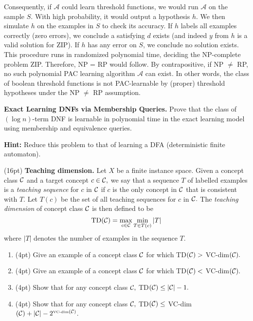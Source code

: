 \documentclass[11pt]{article}
\DeclareMathOperator{\1}{\mathbbm{1}}
\begin{document}
Consequently, if $\mathcal{A}$ could learn threshold functions, we would run $\mathcal{A}$ on the sample $S$. With high probability, it would output a hypothesis $h$. We then simulate $h$ on the examples in $S$ to check its accuracy. If $h$ labels all examples correctly (zero errors), we conclude a satisfying $d$ exists (and indeed $y$ from $h$ is a valid solution for ZIP). If $h$ has any error on $S$, we conclude no solution exists. This procedure runs in randomized polynomial time, deciding the NP-complete problem ZIP. Therefore, NP = RP would follow. By contrapositive, if NP $\neq$ RP, no such polynomial PAC learning algorithm $\mathcal{A}$ can exist. In other words, the class of boolean threshold functions is not PAC-learnable by (proper) threshold hypotheses under the NP $\neq$ RP assumption.

\begin{problem}[15 pts] \textbf{Exact Learning DNFs via Membership Queries.} Prove that the class of $(\log n)$-term DNF is learnable in polynomial time in the exact learning model using membership and equivalence queries.

\textbf{Hint:} Reduce this problem to that of learning a DFA (deterministic finite automaton).
\end{problem}


\begin{problem} (16pt) \textbf{Teaching dimension.} 
Let $X$ be a finite instance space.  Given a concept class ${\cal C}$ and a
target concept $c \in {\cal C},$  we say that a sequence $T$ of labelled
examples is a {\em teaching sequence} for $c$ in ${\cal C}$ if $c$ is the only
concept in ${\cal C}$ that is consistent with $T$. Let $T(c)$ be the set of all
teaching sequences for $c$ in ${\cal C}.$  The {\em teaching dimension} of
concept class ${\cal C}$ is then defined to be
%
\[ \mbox{TD}({\cal C}) = \max_{c \in {\cal C}} \min_{T \in T(c)} |T| \] 
%
where $|T|$ denotes the number of examples in the sequence $T$.
\begin{enumerate}
\item (4pt) Give an example of a concept class ${\cal C}$ for which TD$({\cal C})
> $ VC-dim$({\cal C}).$
\item (4pt) Give an example of a concept class ${\cal C}$ for which TD$({\cal C})
< $ VC-dim$({\cal C}).$
\item (4pt) Show that for any concept class ${\cal C},$ TD$({\cal C}) \leq |{\cal
C}|-1.$
\item (4pt) Show that for any concept class ${\cal C},$ TD$({\cal C}) \leq $
VC-dim$({\cal C}) + |{\cal C}|- 2^{\mbox{\tiny{VC-dim}} ({\cal C})}$.
\end{enumerate}

\end{problem}
\end{document}
